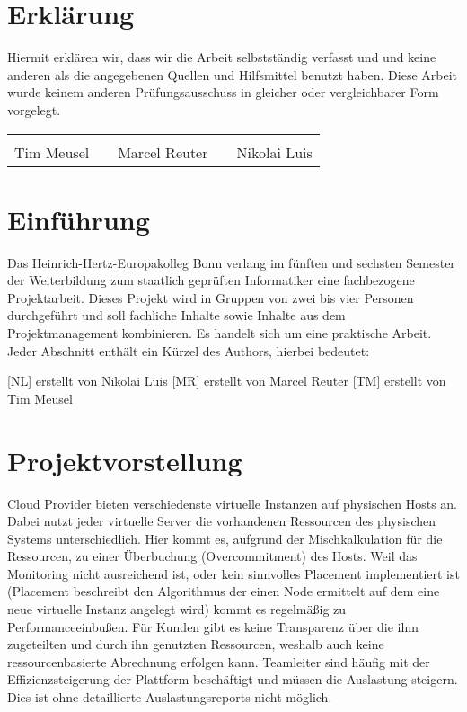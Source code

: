 \section{Erklärung}
Hiermit erklären wir, dass wir die Arbeit selbstständig verfasst und und keine
anderen als die angegebenen Quellen und Hilfsmittel benutzt haben. Diese Arbeit
wurde keinem anderen Prüfungsausschuss in gleicher oder vergleichbarer Form
vorgelegt.

\vfill
{\centering
\renewcommand{\arraystretch}{0.9}
\begin{tabular}{p{}p{}p{}p{}p{}}
  \dotfill                    & & \dotfill                      & & \dotfill \\
  \centering\footnotesize{Tim Meusel}& & \centering\footnotesize{Marcel Reuter}& & \centering\footnotesize{Nikolai Luis}%
\end{tabular}
}

\newpage

\section{Einführung}
Das Heinrich-Hertz-Europakolleg Bonn verlang im fünften und sechsten Semester
der Weiterbildung zum staatlich geprüften Informatiker eine fachbezogene
Projektarbeit. Dieses Projekt wird in Gruppen von zwei bis vier Personen
durchgeführt und soll fachliche Inhalte sowie Inhalte aus dem Projektmanagement
kombinieren. Es handelt sich um eine praktische Arbeit. Jeder Abschnitt enthält
ein Kürzel des Authors, hierbei bedeutet:
\begin{outline}
  \1 {[NL]} erstellt von Nikolai Luis
  \1 {[MR]} erstellt von Marcel Reuter
  \1 {[TM]} erstellt von Tim Meusel
\end{outline}

\section{Projektvorstellung}
Cloud Provider bieten verschiedenste virtuelle Instanzen auf physischen Hosts
an. Dabei nutzt jeder virtuelle Server die vorhandenen Ressourcen des
physischen Systems unterschiedlich. Hier kommt es, aufgrund der
Mischkalkulation für die Ressourcen, zu einer Überbuchung (Overcommitment) des
Hosts. Weil das Monitoring nicht ausreichend ist, oder kein sinnvolles
Placement implementiert ist (Placement beschreibt den Algorithmus der einen
Node ermittelt auf dem eine neue virtuelle Instanz angelegt wird) kommt es
regelmäßig zu Performanceeinbußen. Für Kunden gibt es keine Transparenz über
die ihm zugeteilten und durch ihn genutzten Ressourcen, weshalb auch keine
ressourcenbasierte Abrechnung erfolgen kann. Teamleiter sind häufig mit der
Effizienzsteigerung der Plattform beschäftigt und müssen die Auslastung
steigern. Dies ist ohne detaillierte Auslastungsreports nicht möglich.

